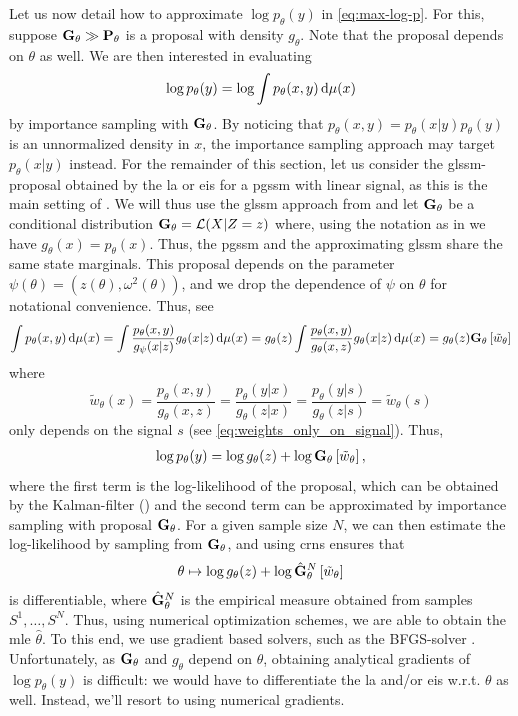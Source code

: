 Let us now detail how to approximate $ \log p_{\theta}(y)$ in \eqref{eq:max-log-p}. For this, suppose $\mathbf G_{\theta} \gg \mathbf P_{\theta}$ is a proposal with density $g_{\theta}$. Note that the proposal depends on $\theta$ as well. We are then interested in evaluating 
$$
    \log p_{\theta}(y) = \log \int p_{\theta}(x,y) \,\mathrm d \mu(x)
$$
by importance sampling with $\mathbf G_{\theta}$. By noticing that $p_{\theta}(x,y) = p_{\theta}(x|y) p_{\theta}(y)$ is an unnormalized density in $x$, the importance sampling approach may target $p_{\theta}(x|y)$ instead. For the remainder of this section, let us consider the \gls{glssm}-proposal obtained by the \gls{la} or \gls{eis} for a \gls{pgssm} with linear signal, as this is the main setting of . 
We will thus use the \gls{glssm} approach from  and let $\mathbf G_{\theta}$ be a conditional distribution $\mathbf G_{\theta} = \mathcal L(X | Z=z)$ where, using the notation as in  we have $g_{\theta}(x) = p_{\theta}(x)$. Thus, the \gls{pgssm} and the approximating \gls{glssm} share the same state marginals. This proposal depends on the parameter $\psi(\theta) = (z(\theta), \omega^{2}(\theta))$, and we drop the dependence of $\psi$ on $\theta$ for notational convenience. Thus, see \citep[Eq. (11.27)]{Durbin2012Time}
$$
    \int p_{\theta}(x,y) \,\mathrm d \mu(x) = \int \frac{p_{\theta}(x,y)}{g_{\psi}(x|z)} g_{\theta}(x|z) \,\mathrm d \mu(x) = g_{\theta}(z) \int \frac{p_{\theta}(x,y)}{g_{\theta}(x,z)} g_{\theta}(x|z) \,\mathrm d\mu (x) = g_{\theta}(z) \mathbf G_{\theta} \left[ \tilde w_{\theta} \right]
$$
where $$\tilde w_{\theta}(x)=\frac{p_{\theta}(x,y)}{g_{\theta}(x,z)} = \frac{p_{\theta}(y|x)}{g_{\theta}(z|x)} = \frac{p_{\theta}(y|s)}{g_{\theta}(z|s)} = \tilde w_{\theta}(s)$$ only depends on the signal $s$ (see \eqref{eq:weights_only_on_signal}). Thus,
\begin{align}
    \label{eq:log_p_theta_G_theta}
    \log p_{\theta}(y) = \log g_{\theta}(z) + \log \mathbf G_{\theta} \left[ \tilde w_{\theta} \right],
\end{align}
where the first term is the log-likelihood of the proposal, which can be obtained by the Kalman-filter () and the second term can be approximated by importance sampling with proposal $\mathbf G_{\theta}$. For a given sample size $N$, we can then estimate the log-likelihood by sampling from $\mathbf G_{\theta}$, and using \glspl{crn} ensures that 
\begin{align}
\label{eq:loglik-hat-standard}
\theta \mapsto \log g_{\theta}(z) + \log \hat{\mathbf G}^{N}_{\theta} \left[ \tilde w_{\theta} \right]
\end{align}
is differentiable, where $\hat{\mathbf G}^{N}_\theta$ is the empirical measure obtained from samples $S^{1}, \dots, S^{N}$. Thus, using numerical optimization schemes, we are able to obtain the \gls{mle} $\hat\theta$. To this end, we use gradient based solvers, such as the BFGS-solver \citep[Chapter 6.1]{Nocedal2006Numerical}. 
Unfortunately, as $\mathbf G_{\theta}$ and $g_{\theta}$ depend on $\theta$, obtaining analytical gradients of $\log p_{\theta}(y)$ is difficult: we would have to differentiate the \gls{la} and/or \gls{eis} w.r.t. $\theta$ as well. Instead, we'll resort to using numerical gradients. 

